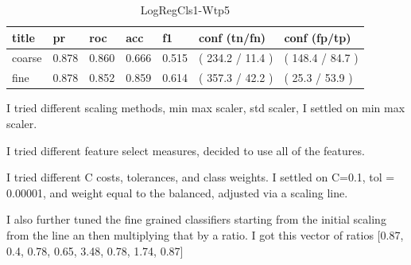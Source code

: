 \documentclass[ms]{nuthesis}
\begin{document}
\FloatBarrier
\begin{table}[h]
\centering
\begin{tabular}{|l||l||l||l||l||l||l|}\toprule
title & pr & roc & acc & f1 & conf (tn/fn) & conf (fp/tp) \\ \midrule
coarse & 0.878 & 0.860 & 0.666 & 0.515 & ( 234.2 / 11.4 ) & ( 148.4 / 84.7 ) \\
fine & 0.878 & 0.852 & 0.859 & 0.614 & ( 357.3 / 42.2 ) & ( 25.3 / 53.9 ) \\ \bottomrule
\end{tabular}
\caption{LogRegCls1-Wtp5}
\label{tab:LogRegCls1-Wtp5}
\end{table}
\FloatBarrier



\par I tried different scaling methods, min max scaler, std scaler, I settled on min max scaler.
\par I tried different feature select measures, decided to use all of the features.
\par I tried different C costs, tolerances, and class weights. I settled on C=0.1, tol = 0.00001,
and weight equal to the balanced, adjusted via a scaling line.
\par I also further tuned the fine grained classifiers starting from the initial scaling from the
line an then multiplying that by a ratio.
I got this vector of ratios
[0.87, 0.4, 0.78, 0.65, 3.48, 0.78, 1.74, 0.87]

\break
\end{document}
